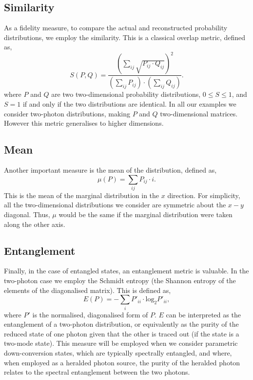 \documentclass[aps,pra,twocolumn,amsmath,amssymb,color,superscriptaddress]{revtex4}
\begin{document}
%
%

\subsection{Similarity}

As a fidelity measure, to compare the actual and reconstructed probability distributions, we employ the similarity. This is a classical overlap metric, defined as,
\begin{equation}
S(P,Q)=\frac{\left(\sum_{ij} \sqrt{P_{ij} \cdot Q_{ij}}\right)^2}{\left(\sum_{ij} P_{ij}\right)\cdot \left(\sum_{ij} Q_{ij}\right)}.
\end{equation}
where $P$ and $Q$ are two two-dimensional probability distributions, \mbox{$0\leq S \leq 1$}, and \mbox{$S=1$} if and only if the two distributions are identical. In all our examples we consider two-photon distributions, making $P$ and $Q$ two-dimensional matrices. However this metric generalises to higher dimensions.

%
%

\subsection{Mean}

Another important measure is the mean of the distribution, defined as,
\begin{equation}
\mu(P) = \sum_{ij} P_{ij} \cdot i.
\end{equation}
This is the mean of the marginal distribution in the $x$ direction. For simplicity, all the two-dimensional distributions we consider are symmetric about the $x-y$ diagonal. Thus, $\mu$ would be the same if the marginal distribution were taken along the other axis.

%
%

\subsection{Entanglement}

Finally, in the case of entangled states, an entanglement metric is valuable. In the two-photon case we employ the Schmidt entropy (the Shannon entropy of the elements of the diagonalised matrix). This is defined as,
\begin{equation}
E(P) = -\sum_i P'_{ii} \cdot \mathrm{log}_2 P'_{ii},
\end{equation}
where $P'$ is the normalised, diagonalised form of $P$. $E$ can be interpreted as the entanglement of a two-photon distribution, or equivalently as the purity of the reduced state of one photon given that the other is traced out (if the state is a two-mode state). This measure will be employed when we consider parametric down-conversion states, which are typically spectrally entangled, and where, when employed as a heralded photon source, the purity of the heralded photon relates to the spectral entanglement between the two photons.
\end{document}
